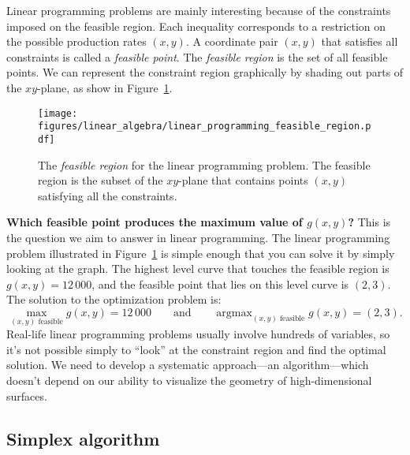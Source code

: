 \documentclass[11pt,oneside]{article}
\begin{document}
	Linear programming problems are mainly interesting because of the constraints imposed on the feasible region.
	Each inequality corresponds to a restriction on the possible production rates $(x,y)$.
	A coordinate pair $(x,y)$ that satisfies all constraints is called a \emph{feasible point}.
	The \emph{feasible region} is the set of all feasible points.
	We can represent the constraint region graphically by shading out parts of the $xy$-plane,
	as show in Figure~\ref{fig:linear_programming_feasible_region}.
	
	
		\begin{figure}[htb]
		\begin{center}
		\texttt{[image: figures/linear\_algebra/linear\_programming\_feasible\_region.pdf]}
		\end{center}
		\vspace{-6mm}
		\caption{The \emph{feasible region} for the linear programming problem. 
				The feasible region is the subset of the $xy$-plane that contains points $(x,y)$ satisfying all the constraints.
				}
		\label{fig:linear_programming_feasible_region}
		\end{figure}

	\noindent
	\textbf{Which feasible point produces the maximum value of $g(x,y)$?}
	This is the question we aim to answer in linear programming.
	The linear programming problem illustrated in Figure~\ref{fig:linear_programming_feasible_region} is
	simple enough that you can solve it by simply looking at the graph.
	The highest level curve that touches the feasible region is $g(x,y)=12\,000$,
	and the feasible point that lies on this level curve is $(2,3)$.
	The solution to the optimization problem is:
	\[
		\max_{(x,y) \textrm{ feasible}} g(x,y) = 12\,000
		\qquad
		\textrm{and}
		\qquad
		\mathop{\textrm{argmax}}_{(x,y) \textrm{ feasible}} g(x,y) = (2,3).
	\]
	Real-life linear programming problems usually involve hundreds of variables,
	so it's not possible simply to ``look'' at the constraint region and find the optimal solution.
	We need to develop a systematic approach---an algorithm---which doesn't
	depend on our ability to visualize the geometry of high-dimensional surfaces.
		
	
\subsection{Simplex algorithm}
\label{applications:simplex_algorithm}
	
\end{document}
